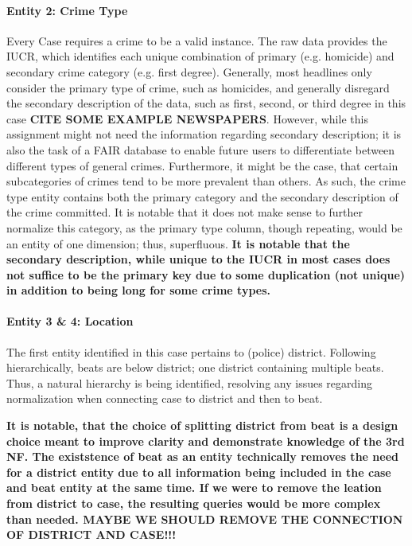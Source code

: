 \documentclass[a4paper]{article}
\begin{document}
\paragraph{Entity 2: Crime Type} Every Case requires a crime to be a valid instance. The raw data provides the IUCR, which identifies each unique combination of primary (e.g. homicide) and secondary crime category (e.g. first degree). Generally, most headlines only consider the primary type of crime, such as homicides, and generally disregard the secondary description of the data, such as first, second, or third degree in this case \textbf{CITE SOME EXAMPLE NEWSPAPERS}. However, while this assignment might not need the information regarding secondary description; it is also the task of a FAIR database to enable future users to differentiate between different types of general crimes. Furthermore, it might be the case, that certain subcategories of crimes tend to be more prevalent than others. As such, the crime type entity contains both the primary category and the secondary description of the crime committed. It is notable that it does not make sense to further normalize this category, as the primary type column, though repeating, would be an entity of one dimension; thus, superfluous. \textbf{It is notable that the secondary description, while unique to the IUCR in most cases does not suffice to be the primary key due to some duplication (not unique) in addition to being long for some crime types.}


\paragraph{Entity 3 \& 4: Location} The first entity identified in this case pertains to (police) district. Following hierarchically, beats are below district; one district containing multiple beats. Thus, a natural hierarchy is being identified, resolving any issues regarding normalization when connecting case to district and then to beat. 

\textbf{It is notable, that the choice of splitting district from beat is a design choice meant to improve clarity and demonstrate knowledge of the 3rd NF. The existstence of beat as an entity technically removes the need for a district entity due to all information being included in the case and beat entity at the same time. If we were to remove the leation from district to case, the resulting queries would be more complex than needed.
MAYBE WE SHOULD REMOVE THE CONNECTION OF DISTRICT AND CASE!!!}
\end{document}
